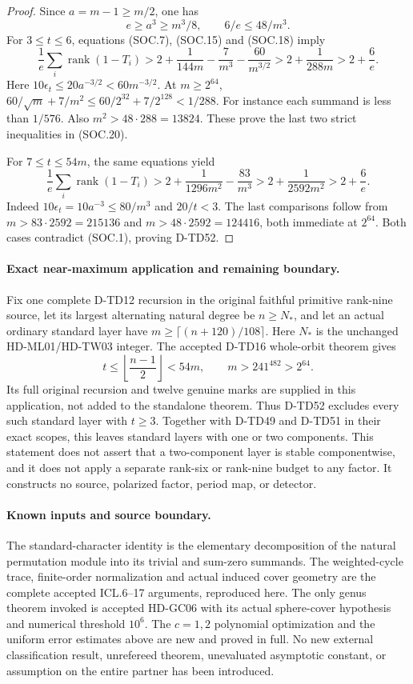 \begin{proof}
Since \(a=m-1\ge m/2\), one has
\[
                   e\ge a^3\ge m^3/8,\qquad
                   6/e\le48/m^3.
 \tag{SOC.19}
\]
For \(3\le t\le6\), equations (SOC.7), (SOC.15) and (SOC.18) imply
\[
 \frac1e\sum_i\operatorname{rank}(1-T_i)
 >2+\frac1{144m}-\frac7{m^3}-\frac{60}{m^{3/2}}
 >2+\frac1{288m}>2+\frac6e.
 \tag{SOC.20}
\]
Here \(10\epsilon_t\le20a^{-3/2}<60m^{-3/2}\).
At \(m\ge2^{64}\),
\(60/\sqrt m+7/m^2\le60/2^{32}+7/2^{128}<1/288\).
For instance each summand is less than \(1/576\).
Also \(m^2>48\cdot288=13824\).
These prove the last two strict inequalities in (SOC.20).

For \(7\le t\le54m\), the same equations yield
\[
 \frac1e\sum_i\operatorname{rank}(1-T_i)
 >2+\frac1{1296m^2}-\frac{83}{m^3}
 >2+\frac1{2592m^2}>2+\frac6e.
 \tag{SOC.21}
\]
Indeed \(10\epsilon_t=10a^{-3}\le80/m^3\) and
\(20/t<3\). The last comparisons follow from
\(m>83\cdot2592=215136\) and
\(m>48\cdot2592=124416\), both immediate at \(2^{64}\).
Both cases contradict (SOC.1), proving D-TD52.
\end{proof}

\paragraph{Exact near-maximum application and remaining boundary.}
Fix one complete D-TD12 recursion in the original faithful primitive
rank-nine source, let its largest alternating natural degree be
\(n\ge N_*\), and let an actual ordinary standard layer have
\(m\ge\lceil(n+120)/108\rceil\). Here \(N_*\) is the unchanged
HD-ML01/HD-TW03 integer. The accepted D-TD16 whole-orbit theorem gives
\[
 t\le\left\lfloor\frac{n-1}{2}\right\rfloor<54m,\qquad
          m>241^{482}>2^{64}.
 \tag{SOC.22}
\]
Its full original recursion and twelve genuine marks are supplied in
this application, not added to the standalone theorem.
Thus D-TD52 excludes every such standard layer with \(t\ge3\).
Together with D-TD49 and D-TD51 in their exact scopes, this leaves
standard layers with one or two components. This statement does not
assert that a two-component layer is stable componentwise, and it
does not apply a separate rank-six or rank-nine budget to any factor.
It constructs no source, polarized factor, period map, or detector.

\paragraph{Known inputs and source boundary.}
The standard-character identity is the elementary decomposition of the
natural permutation module into its trivial and sum-zero summands.
The weighted-cycle trace, finite-order normalization and actual induced
cover geometry are the complete accepted ICL.6--17 arguments, reproduced
here. The only genus theorem invoked is accepted HD-GC06 with its actual
sphere-cover hypothesis and numerical threshold \(10^6\).
The \(c=1,2\) polynomial optimization and the uniform error estimates
above are new and proved in full. No new external classification result,
unrefereed theorem, unevaluated asymptotic constant, or assumption on the
entire partner has been introduced.
